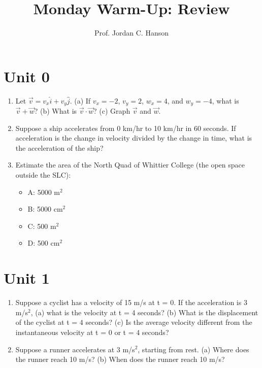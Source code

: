 \documentclass{article}
\begin{document}
\twocolumn

\title{Monday Warm-Up: Review}
\author{Prof. Jordan C. Hanson}

\maketitle

\section{Unit 0}

\begin{enumerate}
\item Let $\vec{v} = v_x\hat{i} + v_y\hat{j}$. (a) If $v_x = -2$, $v_y = 2$, $w_x = 4$, and $w_y = -4$, what is $\vec{v} + \vec{w}$?  (b) What is $\vec{v} \cdot \vec{w}$? (c) Graph $\vec{v}$ and $\vec{w}$. \\ \vspace{3cm}
\item Suppose a ship accelerates from 0 km/hr to 10 km/hr in 60 seconds. If acceleration is the change in velocity divided by the change in time, what is the acceleration of the ship? \\ \vspace{2.5cm}
\item Estimate the area of the North Quad of Whittier College (the open space outside the SLC):
\begin{itemize}
\item A: 5000 m$^2$
\item B: 5000 cm$^2$
\item C: 500 m$^2$
\item D: 500 cm$^2$
\end{itemize}
\end{enumerate}

\section{Unit 1}

\begin{enumerate}
\item Suppose a cyclist has a velocity of 15 m/s at t = 0. If the acceleration is 3 m/s$^2$, (a) what is the velocity at t = 4 seconds? (b) What is the displacement of the cyclist at t = 4 seconds? (c) Is the average velocity different from the instantaneous velocity at t = 0 or t = 4 seconds? \\ \vspace{3cm}
\item Suppose a runner accelerates at 3 m/s$^2$, starting from rest. (a) Where does the runner reach 10 m/s? (b) When does the runner reach 10 m/s? \\ \vspace{3cm}
\end{enumerate}
\end{document}

